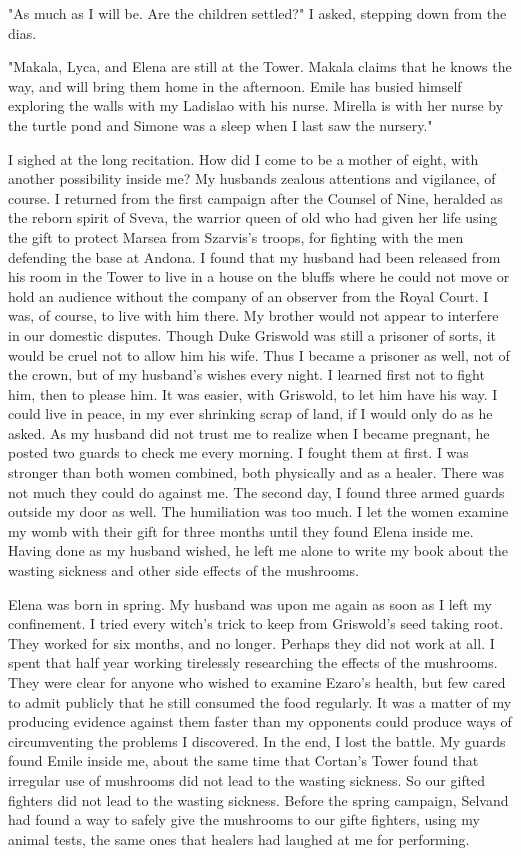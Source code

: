 \documentclass{article}
\begin{document}
"As much as I will be. Are the children settled?" I asked, stepping down from the dias. 

"Makala, Lyca, and Elena are still at the Tower. Makala claims that he knows the way, and will bring them home in the afternoon. Emile has busied himself exploring the walls with my Ladislao with his nurse. Mirella is with her nurse by the turtle pond and Simone was a sleep when I last saw the nursery."

I sighed at the long recitation. How did I come to be a mother of eight, with another possibility inside me? My husbands zealous attentions and vigilance, of course. I returned from the first campaign after the Counsel of Nine, heralded as the reborn spirit of Sveva, the warrior queen of old who had given her life using the gift to protect Marsea from Szarvis's troops, for fighting with the men defending the base at Andona. I found that my husband had been released from his room in the Tower to live in a house on the bluffs where he could not move or hold an audience without the company of an observer from the Royal Court. I was, of course, to live with him there. My brother would not appear to interfere in our domestic disputes. Though Duke Griswold was still a prisoner of sorts, it would be cruel not to allow him his wife. Thus I became a prisoner as well, not of the crown, but of my husband's wishes every night. I learned first not to fight him, then to please him. It was easier, with Griswold, to let him have his way. I could live in peace, in my ever shrinking scrap of land, if I would only do as he asked. As my husband did not trust me to realize when I became pregnant, he posted two guards to check me every morning. I fought them at first. I was stronger than both women combined, both physically and as a healer. There was not much they could do against me. The second day, I found three armed guards outside my door as well. The humiliation was too much. I let the women examine my womb with their gift for three months until they found Elena inside me. Having done as my husband wished, he left me alone to write my book about the wasting sickness and other side effects of the mushrooms. 

Elena was born in spring. My husband was upon me again as soon as I left my confinement.  I tried every witch's trick to keep from Griswold's seed taking root. They worked for six months, and no longer. Perhaps they did not work at all. I spent that half year working tirelessly researching the effects of the mushrooms. They were clear for anyone who wished to examine Ezaro's health, but few cared to admit publicly that he still consumed the food regularly. It was a matter of my producing evidence against them faster than my opponents could  produce ways of circumventing the problems I discovered. In the end, I lost the battle. My guards found Emile inside me, about the same time that Cortan's Tower found that irregular use of mushrooms did not lead to the wasting sickness. So our gifted fighters did not lead to the wasting sickness. Before the spring campaign, Selvand had found a way to safely give the mushrooms to our gifte fighters, using my animal tests, the same ones that healers had laughed at me for performing. 
\end{document}
